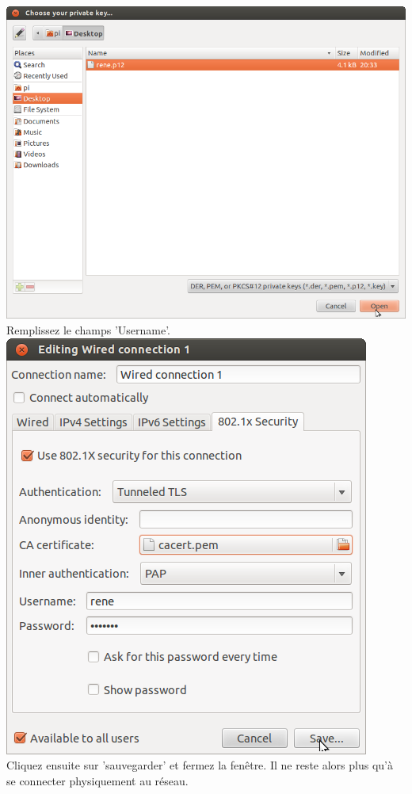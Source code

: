 \includegraphics[width=\screenShotSize{}]{img/selectP12.png}\\
Remplissez le champs 'Username'.\\
\includegraphics[width=\screenShotSize{}]{img/ttls.png}\\
Cliquez ensuite sur 'sauvegarder' et fermez la fenêtre.
Il ne reste alors plus qu'à se connecter physiquement au réseau.\\





